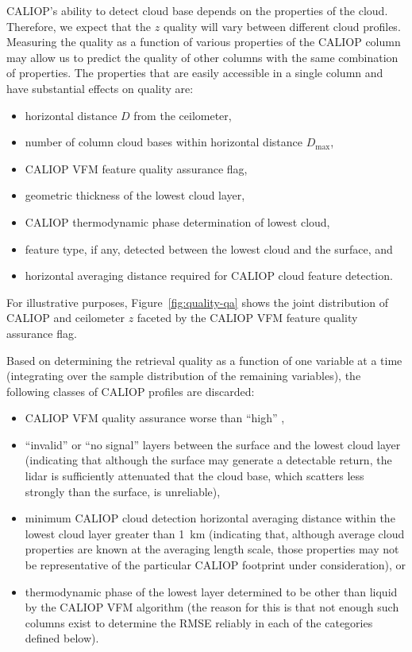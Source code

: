 \documentclass[essd,manuscript]{copernicus}\usepackage[]{graphicx}\usepackage[]{color}
\newcommand\CBH{\ensuremath{z}}
\begin{document}
CALIOP's ability to detect cloud base depends on the properties of the cloud.
Therefore, we expect that the \CBH{} quality will vary between
different cloud profiles.  Measuring the quality as a function of various
properties of the CALIOP column may allow us to predict the quality of other
columns with the same combination of properties.  The properties that are easily
accessible in a single column and have substantial effects on quality are:
\begin{itemize}
\item horizontal distance $D$ from the ceilometer,
\item number of column cloud bases within horizontal distance $D_\text{max}$,
\item CALIOP VFM feature quality assurance flag,
\item geometric thickness of the lowest cloud layer,
\item CALIOP thermodynamic phase determination of lowest cloud,
\item feature type, if any, detected between the lowest cloud and the surface, and
\item horizontal averaging distance required for CALIOP cloud feature
  detection.
\end{itemize}
For illustrative purposes, Figure~\ref{fig:quality-qa} shows the joint
distribution of CALIOP and ceilometer \CBH{} faceted by the CALIOP
VFM feature quality assurance flag.  

Based on determining the retrieval quality as a function of one variable at a
time (integrating over the sample distribution of the remaining variables), the
following classes of CALIOP profiles are discarded:
\begin{itemize}
\item CALIOP VFM quality assurance worse than ``high'' ,
\item ``invalid'' or ``no signal'' layers between the surface and the lowest
  cloud layer (indicating that although the surface may generate a detectable
  return, the lidar is sufficiently attenuated that the cloud base, which
  scatters less strongly than the surface, is unreliable),
\item minimum CALIOP cloud detection horizontal averaging distance within the
  lowest cloud layer greater than 1~km (indicating that, although average cloud
  properties are known at the averaging length scale, those properties may not
  be representative of the particular CALIOP footprint under consideration), or
\item thermodynamic phase of the lowest layer determined to be other than liquid
  by the CALIOP VFM algorithm (the reason for this is that not enough such
  columns exist to determine the RMSE reliably in each of the categories defined
  below).
\end{itemize}
\end{document}
